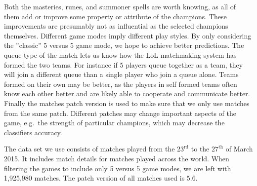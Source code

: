 Both the masteries, runes, and summoner spells are worth knowing, as all of them add or improve some property or attribute of the champions. These improvements are presumably not as influential as the selected champions themselves.
Different game modes imply different play styles. By only considering the ”classic” 5 versus 5 game mode, we hope to achieve better predictions.
The queue type of the match lets us know how the LoL matchmaking system has formed the two teams. For instance if 5 players queue together as a team, they will join a different queue than a single player who join a queue alone.
Teams formed on their own may be better, as the players in self formed teams often know each other better and are likely able to cooperate and communicate better.
Finally the matches patch version is used to make sure that we only use matches from the same patch. Different patches may change important aspects of the game, e.g.\ the strength of particular champions, which may decrease the classifiers accuracy. 

The data set we use consists of matches played from the $23^{\text{rd}}$ to the $27^{\text{th}}$ of March 2015. It includes match details for matches played across the world. When filtering the games to include only 5 versus 5 game modes, we are left with 1,925,980 matches. The patch version of all matches used is $5.6$.


